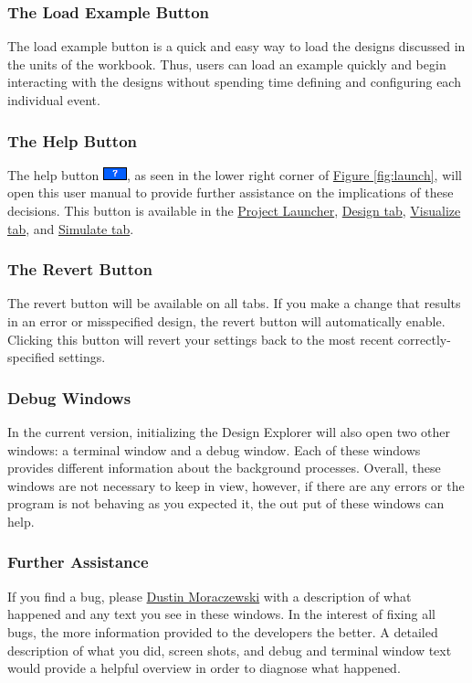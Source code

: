 \documentclass[10pt]{article}
\newcommand*{\hbut}{\includegraphics[scale=0.45]{fig/0_help.jpg}}
\begin{document}
		\subsubsection{The Load Example Button}
		\label{subsubsec:example}
			The load example button is a quick and easy way to load the designs discussed in the units of the workbook.
			Thus, users can load an example quickly and begin interacting with the designs without spending time defining and configuring each individual event.

		\subsubsection{The Help Button}
		\label{subsubsec:hbut}
			The help button \hbut{}, as seen in the lower right corner of \hyperref[fig:launch]{Figure \ref{fig:launch}}, will open this user manual to provide further assistance on the implications of these decisions.
			This button is available in the \hyperref[fig:launch]{Project Launcher}, \hyperref[sec:design]{Design tab}, \hyperref[sec:visualize]{Visualize tab}, and \hyperref[sec:simulate]{Simulate tab}.

		\subsubsection{The Revert Button}
		\label{subsubsec:revert}
			The revert button will be available on all tabs.
			If you make a change that results in an error or misspecified design, the revert button will automatically enable.
			Clicking this button will revert your settings back to the most recent correctly-specified settings.

		\subsubsection{Debug Windows}
		\label{subsubsec:debug}
			In the current version, initializing the Design Explorer will also open two other windows: a terminal window and a debug window.
			Each of these windows provides different information about the background processes.
			Overall, these windows are not necessary to keep in view, however, if there are any errors or the program is not behaving as you expected it, the out put of these windows can help.

		\subsubsection{Further Assistance}
		\label{subsubsec:furtherhelp}
			If you find a bug, please \href{mailto:dmoracze@umd.edu}{Dustin Moraczewski} with a description of what happened and any text you see in these windows.
			In the interest of fixing all bugs, the more information provided to the developers the better.
			A detailed description of what you did, screen shots, and debug and terminal window text would provide a helpful overview in order to diagnose what happened.
\end{document}
